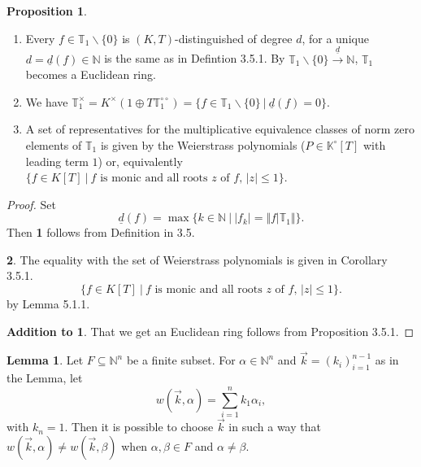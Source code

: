 \documentclass[10pt]{article}
\numberwithin{equation}{section}
\theoremstyle{definition}
\newtheorem{proposition}{Proposition}[subsection]
\newtheorem{lemma}{Lemma}[subsection]
\newcommand{\norm}[1]{\Vert #1 \Vert}
\newcommand{\N}[0]{\mathbb{N}}
\newcommand{\sep}[0]{\:|\:}
\newcommand{\ab}[1]{\vert #1 \vert}
\newcommand{\dcirc}[0]{{\circ\circ}}
\begin{document}
\begin{proposition}
    \label{proposition_29_1}
    $\:$
    \begin{enumerate}
        \item Every $f\in\mathbb{T}_1\backslash\{0\}$ is $(K,T)$-distinguished of degree $d$, for a unique $d = \underline{d}(f)\in\N$ is the same as in Defintion 3.5.1. By $\mathbb{T}_1\backslash\{0\}\stackrel{\underline{d}}{\to}\N$, $\mathbb{T}_1$ becomes a Euclidean ring.
        \item We have $\mathbb{T}_1^\times = K^\times(1\oplus T\mathbb{T}^\dcirc_1) = \{f\in\mathbb{T}_1\backslash\{0\}\sep \underline{d}(f)=0\}$.
        \item A set of representatives for the multiplicative equivalence classes of norm zero elements of $\mathbb{T}_1$ is given by the Weierstrass polynomials ($P\in\mathbb{K}^\circ[T]$ with leading term $1$) or, equivalently $\{f\in K[T]\sep \text{$f$ is monic and all roots $z$ of $f$, $\ab{z}\leq 1$}\}$.
    \end{enumerate}
\end{proposition}
\begin{proof}
    Set 
    \begin{equation*}
        \underline{d}(f) = \max\{k\in\N\sep \ab{f_k}=\norm{f|\mathbb{T}_1}\}.
    \end{equation*}
    Then \textbf{1} follows from Definition in 3.5.
    \par\textbf{2}. The equality with the set of Weierstrass polynomials is given in Corollary 3.5.1.
    \begin{equation*}
        \{f\in K[T]\sep \text{$f$ is monic and all roots $z$ of $f$, $\ab{z}\leq 1$}\}.
    \end{equation*}
    by Lemma 5.1.1.
    \par\textbf{Addition to 1}. That we get an Euclidean ring follows from Proposition 3.5.1.
\end{proof}

\begin{lemma}
    \label{lemma_29_1_1}
    Let $F\subseteq\N^n$ be a finite subset. For $\alpha\in\N^n$ and $\vec{k} =(k_i)_{i=1}^{n-1}$ as in the Lemma, let 
    \begin{equation*}
        w(\vec{k},\alpha) = \sum_{i=1}^n k_1\alpha_i,
    \end{equation*}
    with $k_n=1$. Then it is possible to choose $\vec{k}$ in such a way that $w(\vec{k},\alpha)\not=w(\vec{k},\beta)$ when $\alpha,\beta\in F$ and $\alpha\not=\beta$. 
\end{lemma}
\end{document}
